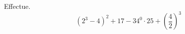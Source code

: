 %
%
  Effectue.
  \[\left( 2^{3} - 4 \right)^{2} + 17 - 34^{0} \cdot 25 + \left( \dfrac{4}{2} \right)^{3}\]
